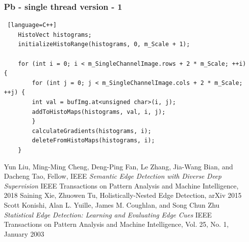 \documentclass{beamer}
\begin{document}

	\begin{frame} [fragile] 
	\frametitle{Pb - single thread version - 1}
	\begin{lstlisting} [language=C++]
	HistoVect histograms;
	initializeHistoRange(histograms, 0, m_Scale + 1);	

	for (int i = 0; i < m_SingleChannelImage.rows + 2 * m_Scale; ++i) {
		for (int j = 0; j < m_SingleChannelImage.cols + 2 * m_Scale; ++j) {
		int val = bufImg.at<unsigned char>(i, j);	
		addToHistoMaps(histograms, val, i, j);
		}
		calculateGradients(histograms, i);
		deleteFromHistoMaps(histograms, i);
	}
	\end{lstlisting} 
	\end{frame}



	\begin{thebibliography}{9}		
		Yun Liu, Ming-Ming Cheng, Deng-Ping Fan, Le Zhang, Jia-Wang Bian, and Dacheng Tao, Fellow, IEEE
		\textit{Semantic Edge Detection with Diverse Deep Supervision} 
		IEEE Transactions on Pattern Analysis and Machine Intelligence, 2018
		Saining Xie, Zhuowen Tu, Holistically-Nested Edge Detection, arXiv 2015
		Scott Konishi, Alan L. Yuille, James M. Coughlan, and Song Chun Zhu
		\textit{Statistical Edge Detection: Learning and Evaluating Edge Cues}
		IEEE Transactions on Pattern Analysis and Machine Intelligence, Vol. 25, No. 1, January 2003

	\end{thebibliography}
\end{document}

